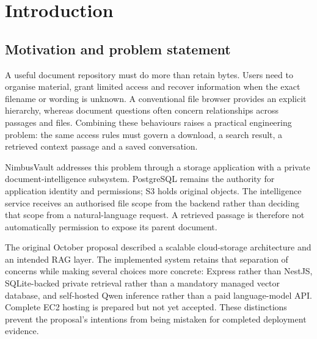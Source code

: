 \documentclass[11pt,a4paper,oneside]{report}
\begin{document}
\chapter{Introduction}
\section{Motivation and problem statement}
A useful document repository must do more than retain bytes. Users need to organise material, grant limited access and recover information when the exact filename or wording is unknown. A conventional file browser provides an explicit hierarchy, whereas document questions often concern relationships across passages and files. Combining these behaviours raises a practical engineering problem: the same access rules must govern a download, a search result, a retrieved context passage and a saved conversation.

NimbusVault addresses this problem through a storage application with a private document-intelligence subsystem. PostgreSQL remains the authority for application identity and permissions; S3 holds original objects. The intelligence service receives an authorised file scope from the backend rather than deciding that scope from a natural-language request. A retrieved passage is therefore not automatically permission to expose its parent document.

The original October proposal described a scalable cloud-storage architecture and an intended RAG layer. The implemented system retains that separation of concerns while making several choices more concrete: Express rather than NestJS, SQLite-backed private retrieval rather than a mandatory managed vector database, and self-hosted Qwen inference rather than a paid language-model API. Complete EC2 hosting is prepared but not yet accepted. These distinctions prevent the proposal's intentions from being mistaken for completed deployment evidence.
\end{document}
